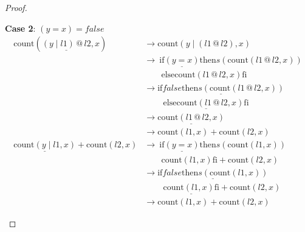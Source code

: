 \documentclass[12pt, a4paper]{article}
\newcommand{\rel}[1]{\mathrel{#1}}
\newcommand{\rmx}[1]{\mathrm{#1}}
\newcommand{\larrow}{\longrightarrow}
\newcommand{\under}{\underline}
\begin{document}
\begin{proof}
\begin{description}
\textbf{Case 2}: $(y = x) = false$
\begin{align*}
\rmx{count}(\under{(y \mid l1) \rel{@} l2}, x)
	&\larrow \rmx{count}(y \mid (l1 \rel{@} l2), x) \tag{by @2} \\
	&\larrow\ \rel{\rmx{if}} \under{(y = x)} \rel{\rmx{then}} s(\rmx{count}(l1 \rel{@} l2, x)) \\
	&\quad \quad \rel{\rmx{else}} \rmx{count}(l1 \rel{@} l2, x) \rel{\rmx{fi}} \tag{by cnt2} \\
	&\larrow \under{\rel{\rmx{if}} false \rel{\rmx{then}} s(\rmx{count}(l1 \rel{@} l2, x))} \\
	&\quad \quad\ \under{\rel{\rmx{else}} \rmx{count}(l1 \rel{@} l2, x) \rel{\rmx{fi}}} \tag{by case splitting} \\
	&\larrow \under{\rmx{count}(l1 \rel{@} l2, x)} \tag{by if2} \\
	&\larrow \rmx{count}(l1, x) + \rmx{count}(l2, x) \tag{by IH} \\
\under{\rmx{count}(y \mid l1, x)} + \rmx{count}(l2, x)
	&\larrow\ \rel{\rmx{if}} \under{(y = x)} \rel{\rmx{then}} s(\rmx{count}(l1, x)) \\
	&\quad \quad \rmx{count}(l1, x) \rel{\rmx{fi}} + \rmx{count}(l2, x) \tag{by cnt2} \\
	&\larrow \under{\rel{\rmx{if}} false \rel{\rmx{then}} s(\rmx{count}(l1, x))} \\
	&\quad \quad\ \under{\rmx{count}(l1, x) \rel{\rmx{fi}}} + \rmx{count}(l2, x) \tag{by case splitting} \\
	&\larrow \rmx{count}(l1, x) + \rmx{count}(l2, x) \tag{by if2}
\end{align*}
\end{description}
\end{proof}
\end{document}

